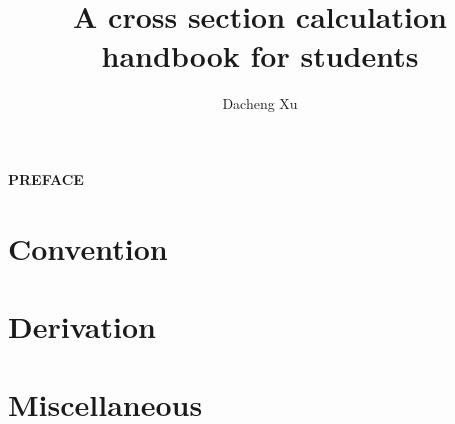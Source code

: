 \documentclass[titlepage]{book}
\title{\textbf{\huge{A cross section calculation handbook for students}}}
\author{
    Dacheng Xu
}
\date{}
\begin{document}

\maketitle


\begin{center}
    \textbf{\Large{PREFACE}}
\end{center}




\pagestyle{empty}
\renewcommand{\baselinestretch}{0.94}\normalsize
\tableofcontents
\listoftodos
\renewcommand{\baselinestretch}{1.0}\normalsize
\restoregeometry
\pagestyle{fancy}

\clearpage



\section{Convention}


\section{Derivation}





\section{Miscellaneous}


% 



\end{document}

